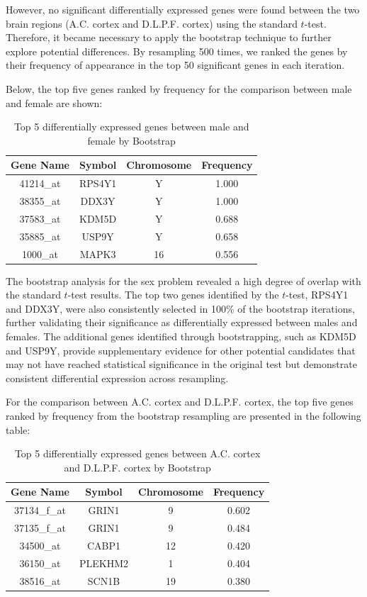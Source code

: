 \documentclass[12pt]{article}
\begin{document}
However, no significant differentially expressed genes were found between the two brain regions (A.C. cortex and D.L.P.F. cortex) using the standard $t$-test. Therefore, it became necessary to apply the bootstrap technique to further explore potential differences. By resampling 500 times, we ranked the genes by their frequency of appearance in the top 50 significant genes in each iteration.

Below, the top five genes ranked by frequency for the comparison between male and female are shown:

\begin{table}[h!]
\centering
\begin{tabular}{|c|c|c|c|}
\hline
\textbf{Gene Name} & \textbf{Symbol} & \textbf{Chromosome} & \textbf{Frequency} \\
\hline
41214\_at & RPS4Y1 & Y & 1.000 \\
38355\_at & DDX3Y & Y & 1.000 \\
37583\_at & KDM5D & Y & 0.688 \\
35885\_at & USP9Y & Y & 0.658 \\
1000\_at & MAPK3 & 16 & 0.556 \\
\hline
\end{tabular}
\caption{Top 5 differentially expressed genes between male and female by Bootstrap}
\end{table}

The bootstrap analysis for the sex problem revealed a high degree of overlap with the standard $t$-test results. The top two genes identified by the $t$-test, RPS4Y1 and DDX3Y, were also consistently selected in 100\% of the bootstrap iterations, further validating their significance as differentially expressed between males and females. The additional genes identified through bootstrapping, such as KDM5D and USP9Y, provide supplementary evidence for other potential candidates that may not have reached statistical significance in the original test but demonstrate consistent differential expression across resampling.

For the comparison between A.C. cortex and D.L.P.F. cortex, the top five genes ranked by frequency from the bootstrap resampling are presented in the following table:

\begin{table}[h!]
\centering
\begin{tabular}{|c|c|c|c|}
\hline
\textbf{Gene Name} & \textbf{Symbol} & \textbf{Chromosome} & \textbf{Frequency} \\
\hline
37134\_f\_at & GRIN1 & 9 & 0.602 \\
37135\_f\_at & GRIN1 & 9 & 0.484 \\
34500\_at & CABP1 & 12 & 0.420 \\
36150\_at & PLEKHM2 & 1 & 0.404 \\
38516\_at & SCN1B & 19 & 0.380 \\
\hline
\end{tabular}
\caption{Top 5 differentially expressed genes between A.C. cortex and D.L.P.F. cortex by Bootstrap}
\end{table}
\end{document}

